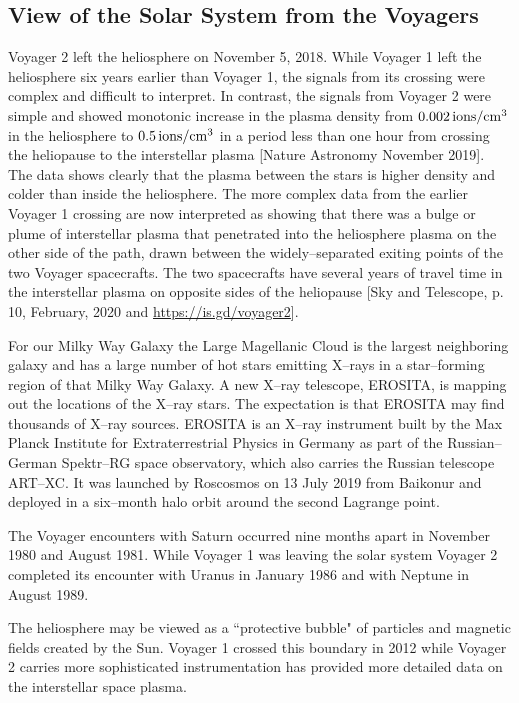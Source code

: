\documentclass[a4paper,openany,12pt]{book}
\begin{document}
\subsection*{View of the Solar System from the Voyagers}

Voyager 2 left the heliosphere on November 5, 2018. While Voyager 1 left the heliosphere six years earlier than Voyager 1, the signals from its crossing were complex and difficult to interpret. In contrast, the signals from Voyager 2 were simple and showed monotonic increase in the plasma density from $0.002\,\rm ions/cm^3$ in the heliosphere to $0.5\,\rm ions/cm^3$ in a period less than one hour from crossing the heliopause to the interstellar plasma [Nature Astronomy November 2019]. The data shows clearly that the plasma between the stars is higher density and colder than inside the heliosphere. The more complex data from the earlier Voyager 1 crossing are now interpreted as showing that there was a bulge or plume of interstellar plasma that penetrated into the heliosphere plasma on the other side of the path, drawn between the widely--separated exiting points of the two Voyager spacecrafts. The two spacecrafts have several years of travel time in the interstellar plasma on opposite sides of the heliopause [Sky and Telescope, p. 10, February, 2020 and \url{https://is.gd/voyager2}].

For our Milky Way Galaxy the Large Magellanic Cloud is the largest neighboring galaxy and has a large number of hot stars emitting X--rays in a star--forming region of that Milky Way Galaxy. A new X--ray telescope, EROSITA, is mapping out the locations of the X--ray stars. The expectation is that EROSITA may find thousands of X--ray sources. EROSITA is an X--ray instrument built by the  Max Planck Institute for Extraterrestrial Physics in Germany as part of the Russian--German Spektr--RG space observatory, which also carries the Russian telescope ART--XC. It was launched by Roscosmos on 13 July 2019 from Baikonur and deployed in a six--month halo orbit around the second Lagrange point.

The Voyager encounters with Saturn occurred nine months apart in November 1980 and August 1981. While Voyager 1 was leaving the solar system Voyager 2 completed its encounter with Uranus in January 1986 and with Neptune in August 1989. 

The heliosphere may be viewed as a ``protective bubble" of particles and magnetic fields created by the Sun. Voyager 1 crossed this boundary in 2012 while Voyager 2 carries more sophisticated instrumentation has provided more detailed data on the interstellar space plasma.
\end{document}
